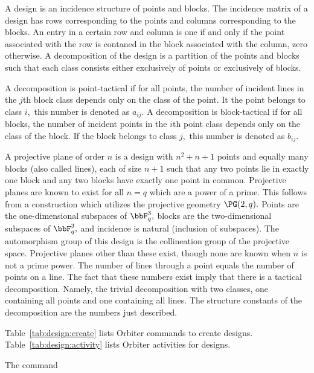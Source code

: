 A design is an incidence structure of points and blocks. 
The incidence matrix of a design has rows corresponding to the points 
and columns corresponding to the blocks. 
An entry in a certain row and column is one if and only if the point associated with the row 
is contaned in the block associated with the column, zero otherwise.
A decomposition of the design is a partition of the points and blocks such that 
each class consists either exclusively of points or exclusively of blocks. 

\bigskip


A decomposition is point-tactical if for all points, 
the number of incident lines in the $j$th block class depends only on the class of the point.
It the point belongs to class $i,$ this number is denoted as $a_{ij}.$
A decomposition is block-tactical if for all blocks, 
the number of incident points in the $i$th point class depends only on the class of the block.
If the block belongs to class $j,$ this number is denoted as $b_{ij}.$

\bigskip

A projective plane of order $n$ is a 
design with $n^2+n+1$ points and equally many blocks (also called lines), each of size $n+1$ such that 
any two points lie in exactly one block and any two blocks have exactly one point in common.
Projective planes are known to exist for all $n = q$ which are a power of a prime. 
This follows from a construction which utilizes the projective geometry $\PG(2,q).$ 
Points are the one-dimensional subspaces of $\bbF_q^3,$
blocks are the two-dimensional subspaces of $\bbF_q^3,$ and
incidence is natural (inclusion of subspaces). 
The automorphism group of this design is the collineation group of the projective space.
Projective planes other than these exist, though none are known when $n$ is not a prime power.
The number of lines through a point equals the number of points on a line. 
The fact that these numbers exist imply that there is a tactical decomposition. 
Namely, the trivial decomposition with two classes, one containing all points and one containing all lines.
The structure constants of the decomposition are the numbers just described.

\bigskip

Table~\ref{tab:design:create} 
lists Orbiter commands to create designs.
Table~\ref{tab:design:activity}
lists Orbiter activities for designs.

The command 

